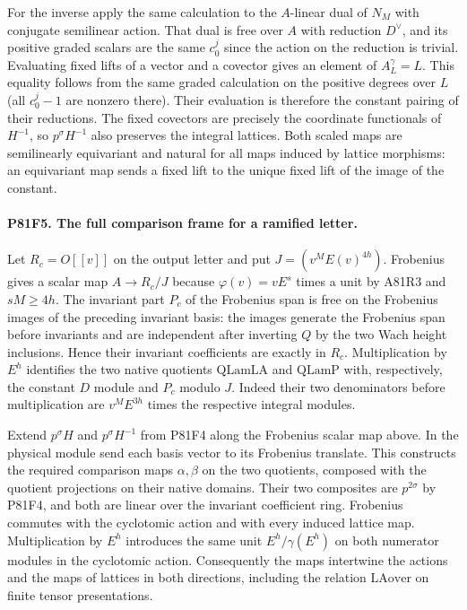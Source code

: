 For the inverse apply the same calculation to the $A$-linear
dual of $N_M$ with conjugate semilinear action. That dual is
free over $A$ with reduction $D^\vee$, and its positive graded
scalars are the same $c_0^j$ since the action on the reduction
is trivial. Evaluating fixed lifts of a vector and a covector
gives an element of $A_L^\gamma=L$. This equality follows from
the same graded calculation on the positive degrees over $L$
(all $c_0^j-1$ are nonzero there). Their evaluation is therefore
the constant pairing of their reductions. The fixed covectors
are precisely the coordinate functionals of $H^{-1}$, so
$p^\sigma H^{-1}$ also preserves the integral lattices. Both
scaled maps are semilinearly equivariant and natural for all
maps induced by lattice morphisms: an equivariant map sends a
fixed lift to the unique fixed lift of the image of the constant.

\paragraph{P81F5. The full comparison frame for a ramified letter.}
Let $R_c=O[[v]]$ on the output letter and put
$J=(v^M E(v)^{4h})$. Frobenius gives a scalar map
$A\to R_c/J$ because $\varphi(v)=v E^s$ times a unit
by A81R3 and $sM\ge4h$. The invariant part $P_c$ of the
Frobenius span is free on the Frobenius images of the preceding
invariant basis: the images generate the Frobenius span before
invariants and are independent after inverting $Q$ by the two
Wach height inclusions. Hence their invariant coefficients are
exactly in $R_c$. Multiplication by $E^h$ identifies the two
native quotients $\mathrm{QLamLA}$ and $\mathrm{QLamP}$ with,
respectively, the constant $D$ module and $P_c$ modulo $J$.
Indeed their two denominators before multiplication are
$v^M E^{3h}$ times the respective integral modules.

Extend $p^\sigma H$ and $p^\sigma H^{-1}$ from P81F4 along the
Frobenius scalar map above. In the physical module send each
basis vector to its Frobenius translate. This constructs the
required comparison maps $\alpha,\beta$ on the two quotients,
composed with the quotient projections on their native domains.
Their two composites are $p^{2\sigma}$ by P81F4, and both
are linear over the invariant coefficient ring. Frobenius
commutes with the cyclotomic action and with every induced
lattice map. Multiplication by $E^h$ introduces the same unit
$E^h/\gamma(E^h)$ on both numerator modules in the cyclotomic
action. Consequently the maps intertwine the actions and the
maps of lattices in both directions, including the relation
$\mathrm{LAover}$ on finite tensor presentations.

